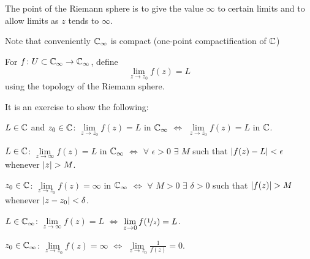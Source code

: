 \documentclass[10pt,aspectratio=169]{beamer}
\begin{document}
\begin{frame}
%
%
The point of the Riemann sphere is to give the value $\infty$ to certain
limits and to allow limits as $z$ tends to $\infty$.

\medskip
\pause

Note that conveniently
${\mathbb{C}}_\infty$ is compact (one-point compactification of ${\mathbb{C}}$)

\medskip
\pause
For $f \colon U \subset {\mathbb{C}}_\infty \to {\mathbb{C}}_\infty$, define
\begin{equation*}
\lim_{z \to z_0} f(z) = L
\end{equation*}
using the topology of the Riemann sphere.

\medskip
\pause

It is an exercise to show the following:

\medskip
\pause

$L \in {\mathbb{C}}$ and $z_0 \in {\mathbb{C}}$: \quad
$\lim\limits_{z\to z_0} f(z) = L$ in ${\mathbb{C}}_\infty$ 
$\Leftrightarrow$ $\lim\limits_{z \to z_0} f(z) = L$ in ${\mathbb{C}}$.

\medskip
\pause
$L \in {\mathbb{C}}$: \quad
$\lim\limits_{z\to \infty} f(z) = L$ in ${\mathbb{C}}_\infty$
$\Leftrightarrow$ $\forall$ $\epsilon > 0$ $\exists$ $M$ such that
$\lvert {f(z)-L} \rvert < \epsilon$ whenever $\lvert {z} \rvert > M$.

\medskip
\pause
$z_0 \in {\mathbb{C}}$: \quad
$\lim\limits_{z\to z_0} f(z) = \infty$ in ${\mathbb{C}}_\infty$
$\Leftrightarrow$ $\forall$ $M > 0$ $\exists$ $\delta > 0$ such that
$\lvert {f(z)} \rvert > M$ whenever $\lvert {z-z_0} \rvert < \delta$.

\medskip
\pause

$L \in {\mathbb{C}}_\infty$: \quad
$\lim\limits_{z\to\infty} f(z) = L$ $\Leftrightarrow$
$\lim\limits_{z \to 0} f(\nicefrac{1}{z}) = L$.

\medskip
\pause

$z_0 \in {\mathbb{C}}_\infty$: \quad
$\lim\limits_{z\to z_0} f(z) = \infty$ $\Leftrightarrow$
$\lim\limits_{z \to z_0} \frac{1}{f(z)} = 0$.
\end{frame}
\end{document}
